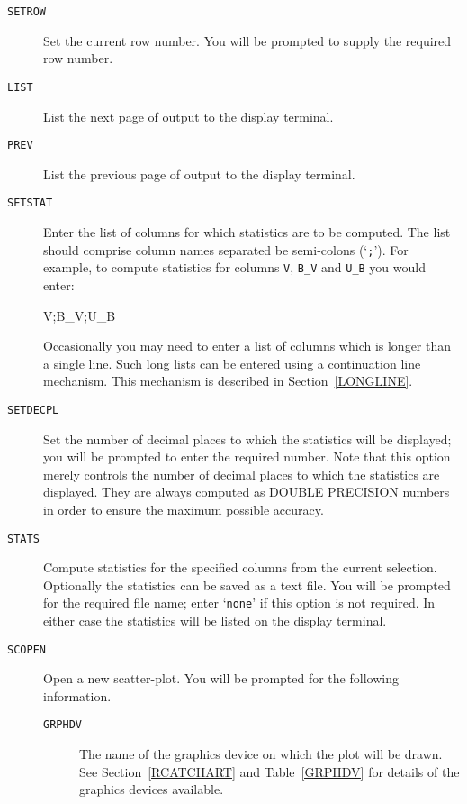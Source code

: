 \documentclass[twoside,11pt]{starlink}
\begin{document}
\begin{description}
  \item[ \texttt{SETROW} ] Set the current row number. You will be prompted
   to supply the required row number.

  \item[ \texttt{LIST} ] List the next page of output to the display
   terminal.

  \item[ \texttt{PREV} ] List the previous page of output to the display
   terminal.

  \item[ \texttt{SETSTAT} ] Enter the list of columns for which statistics
   are to be computed.  The list should comprise column names separated
   be semi-colons (`\texttt{;}').  For example, to compute statistics for
   columns \texttt{V}, \texttt{B\_V} and \texttt{U\_B} you would enter:

  \begin{terminalv}
V;B_V;U_B
  \end{terminalv}

   Occasionally you may need to enter a list of columns which is longer
   than a single line.  Such long lists can be entered using a continuation
   line mechanism.  This mechanism is described in Section~\ref{LONGLINE}.

  \item[ \texttt{SETDECPL} ] Set the number of decimal places to which the
   statistics will be displayed; you will be prompted to enter the
   required number.  Note that this option merely controls the number of
   decimal places to which the statistics are displayed.  They are
   always computed as DOUBLE PRECISION numbers in order to ensure the
   maximum possible accuracy.

  \item[ \texttt{STATS} ] Compute statistics for the specified columns from
   the current selection.  Optionally the statistics can be saved as a
   text file.  You will be prompted for the required file name; enter
   `\texttt{none}' if this option is not required.  In either case the
   statistics will be listed on the display terminal.

  \item[ \texttt{SCOPEN} ] Open a new scatter-plot.  You will be prompted
   for the following information.

  \begin{description}

    \item[ \texttt{GRPHDV} ] The name of the graphics device on which
     the plot will be drawn.  See Section~\ref{RCATCHART} and
     Table~\ref{GRPHDV} for details of the graphics devices available.


\end{description}
\end{description}
\end{document}

